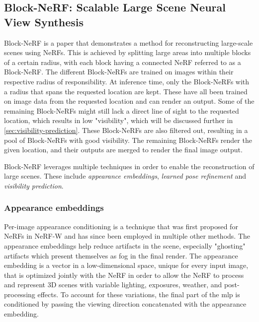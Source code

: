 \subsection[Block-NeRF]{Block-NeRF: Scalable Large Scene Neural View Synthesis} \label{sec:block-nerf}
Block-NeRF \cite{tancik_block-nerf_2022} is a paper that demonstrates a method for reconstructing large-scale scenes using NeRFs. This is achieved by splitting large areas into multiple blocks of a certain radius, with each block having a connected NeRF referred to as a Block-NeRF. The different Block-NeRFs are trained on images within their respective radius of responsibility. At inference time, only the Block-NeRFs with a radius that spans the requested location are kept. These have all been trained on image data from the requested location and can render an output. Some of the remaining Block-NeRFs might still lack a direct line of sight to the requested location, which results in low "visibility", which will be discussed further in \autoref{sec:visibility-prediction}. These Block-NeRFs are also filtered out, resulting in a pool of Block-NeRFs with good visibility. The remaining Block-NeRFs render the given location, and their outputs are merged to render the final image output.

Block-NeRF leverages multiple techniques in order to enable the reconstruction of large scenes. These include \textit{appearance embeddings}, \textit{learned pose refinement} and \textit{visibility prediction}.

\subsubsection{Appearance embeddings} \label{sec:appearance-embeddings}
Per-image appearance conditioning is a technique that was first proposed for NeRFs in NeRF\nobreakdash-W \cite{martin-brualla_nerf_2021} and has since been employed in multiple other methods. The appearance embeddings help reduce artifacts in the scene, especially "ghosting" artifacts which present themselves as fog in the final render. The appearance embedding is a vector in a low-dimensional space, unique for every input image, that is optimized jointly with the NeRF in order to allow the NeRF to process and represent 3D scenes with variable lighting, exposures, weather, and post-processing effects. To account for these variations, the final part of the \acrshort{mlp} is conditioned by passing the viewing direction concatenated with the appearance embedding.

